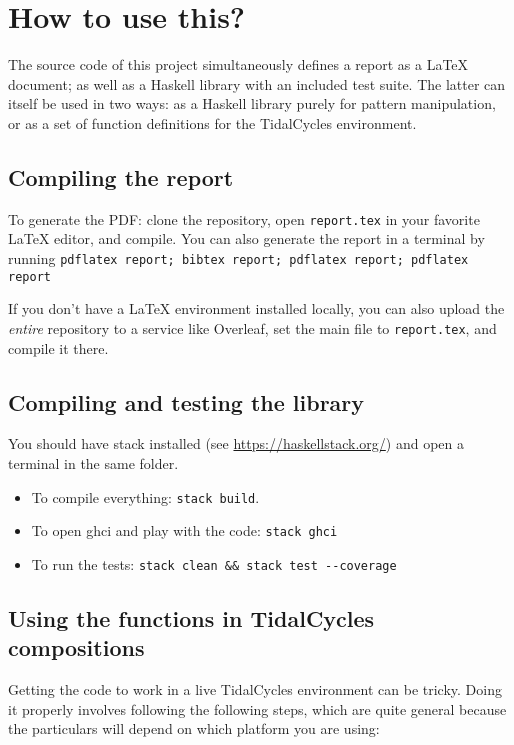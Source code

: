 
\section{How to use this?}

The source code of this project simultaneously defines
a report as a \LaTeX{} document;
as well as a Haskell library with an included test suite.
The latter can itself be used in two ways:
as a Haskell library purely for pattern manipulation,
or as a set of function definitions for the TidalCycles environment.

\subsection{Compiling the report}

To generate the PDF: clone the repository, open \texttt{report.tex} in your favorite \LaTeX{} editor, and compile.
You can also generate the report in a terminal by running
\texttt{pdflatex report; bibtex report; pdflatex report; pdflatex report}

If you don't have a \LaTeX{} environment installed locally, you can also upload the \emph{entire} repository to a service like Overleaf, set the main file to \texttt{report.tex}, and compile it there.

\subsection{Compiling and testing the library}

You should have stack installed (see \url{https://haskellstack.org/}) and
open a terminal in the same folder.

\begin{itemize}
  \item To compile everything: \verb|stack build|.
  \item To open ghci and play with the code: \verb|stack ghci|
  \item To run the tests: \verb|stack clean && stack test --coverage|
\end{itemize}

\subsection{Using the functions in TidalCycles compositions}

Getting the code to work in a live TidalCycles environment can be tricky.
Doing it properly involves following the following steps, which are quite general because the particulars will depend on which platform you are using:

